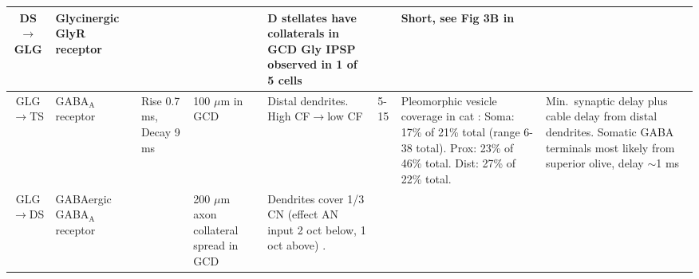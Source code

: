 \begin{longtable}{cYYYYYYY}
\\ \midrule
DS\ensuremath{\rightarrow}GLG                                 
&                  
Glycinergic GlyR receptor                  
&  %
& 
& 
D stellates have collaterals in GCD \citep[mouse][]{OertelWuEtAl:1990}
Gly IPSP observed in 1 of 5 cells \citep{FerragamoGoldingEtAl:1998}    
&                                            
& %
Short, see Fig 3B in \citep{FerragamoGoldingEtAl:1998}
\\ \midrule
GLG\ensuremath{\rightarrow}TS                         
&%
GABA$_{\textrm{A}}$ receptor  \citep[bicuculine-sensitive VCN T stellate cell, mouse slice preparation][]{FerragamoGoldingEtAl:1998} \citep[Chinchilla][]{JosephsonMorest:1998}
& %
Rise 0.7 ms, Decay 9 ms  \citep[probably a combination of two decay time constants, fast 5-10 slow 20-60][]{AwatramaniTurecekEtAl:2005}                     
& %
100 $\mu$m in GCD \citep{FerragamoGoldingEtAl:1998}
& %
Distal dendrites.
High CF\ensuremath{\rightarrow}low CF \citep[chinchilla][]{JosephsonMorest:1998}                        
& %
5-15 \citep[Estimate, cat][]{SmithRhode:1989}     
& %
Pleomorphic vesicle coverage in cat \citep{SmithRhode:1989}:
Soma: 17\% of 21\% total (range 6-38 total). 
Prox: 23\% of 46\% total. 
Dist: 27\% of 22\% total. 
& %
Min.\ synaptic delay plus cable delay from distal dendrites.
Somatic GABA terminals most likely from superior olive, delay $\sim$1 ms
\\ \midrule
GLG\ensuremath{\rightarrow}DS                         
& %
{GABAergic} {GABA$_{\textrm{A}}$} receptor \citep{EvansZhao:1998,FerragamoGoldingEtAl:1998a,Mugnaini:1985,MugnainiOsenEtAl:1980,SaintMorestEtAl:1989}                           
& %
& %
200 $\mu$m axon collateral spread in GCD \citep{FerragamoGoldingEtAl:1998}
& %
Dendrites cover 1/3 CN (effect AN input 2 oct below, 1 oct above) \citep[guinea pig][]{PalmerJiangEtAl:1996}.

\end{longtable}
